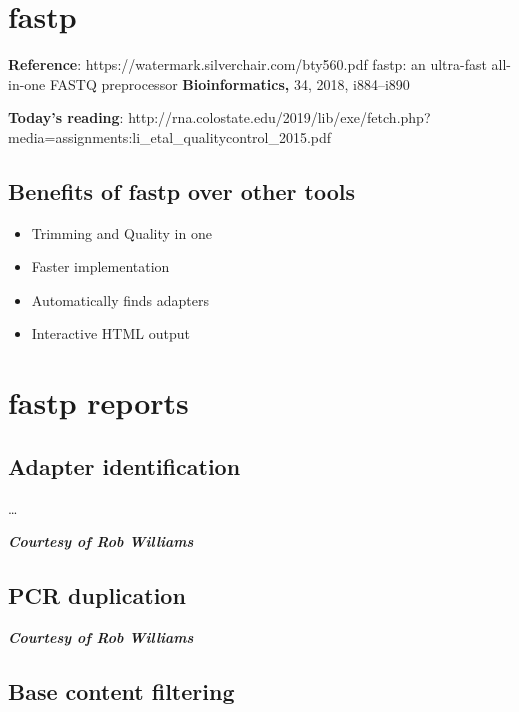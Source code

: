 \documentclass[11pt]{article}
\providecommand{\tightlist}{%
      \setlength{\itemsep}{0pt}\setlength{\parskip}{0pt}}
\begin{document}
\hypertarget{fastp}{%
\section{fastp}\label{fastp}}

\textbf{Reference}: https://watermark.silverchair.com/bty560.pdf fastp:
an ultra-fast all-in-one FASTQ preprocessor \textbf{Bioinformatics,} 34,
2018, i884--i890

\textbf{Today's reading}:
http://rna.colostate.edu/2019/lib/exe/fetch.php?media=assignments:li\_etal\_qualitycontrol\_2015.pdf

\hypertarget{benefits-of-fastp-over-other-tools}{%
\subsection{Benefits of fastp over other
tools}\label{benefits-of-fastp-over-other-tools}}

\begin{itemize}
\tightlist
\item
  Trimming and Quality in one
\item
  Faster implementation
\item
  Automatically finds adapters
\item
  Interactive HTML output
\end{itemize}

\hypertarget{fastp-reports}{%
\section{fastp reports}\label{fastp-reports}}

\hypertarget{adapter-identification}{%
\subsection{Adapter identification}\label{adapter-identification}}

\ldots{}

\textbf{\emph{Courtesy of Rob Williams}}

\hypertarget{pcr-duplication}{%
\subsection{PCR duplication}\label{pcr-duplication}}

\textbf{\emph{Courtesy of Rob Williams}}

\hypertarget{base-content-filtering}{%
\subsection{Base content filtering}\label{base-content-filtering}}
\end{document}
